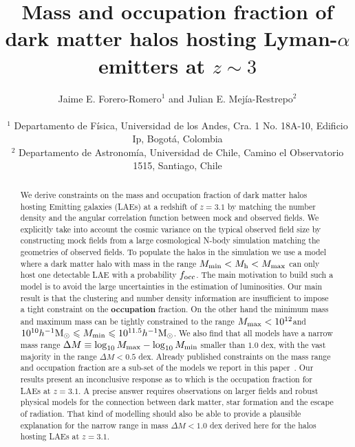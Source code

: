 \documentclass[usenatbib]{mn2e}
\newcommand{\documentname}{paper~}
\newcommand{\ly}{{\ifmmode{{\rm Ly}\alpha}\else{Ly$\alpha$~}\fi}}
\newcommand{\hMsun}{{\ifmmode{h^{-1}{\rm
        {M_{\odot}}}}\else{$h^{-1}{\rm{M_{\odot}}}$}\fi}}
\begin{document}
\title[Halo mass and occupation fraction of LAEs at$z=3.1$]{Mass and
  occupation fraction of dark matter halos hosting Lyman-$\alpha$
  emitters at $z\sim 3$}      
\author[~J.~E. Forero-Romero and ~J.~E. Mejia-Restreo]{
\parbox[t]{\textwidth}{\raggedright 
  Jaime E. Forero-Romero$^{1}$ and
  Julian E. Mej\'ia-Restrepo$^{2}$ 
}
\vspace*{6pt}\\
$^{1}$ Departamento de F\'{i}sica, Universidad de los Andes, Cra. 1
No. 18A-10, Edificio Ip, Bogot\'a, Colombia \\
$^{2}$ Departamento de Astronom\'{i}a, Universidad de Chile, Camino el
Observatorio 1515, Santiago, Chile} 

\maketitle

\begin{abstract}
%
We derive constraints on the mass and occupation fraction of dark
matter halos hosting \ly Emitting galaxies (LAEs) at a redshift of
$z=3.1$ by matching the number density and the angular
correlation function between mock and observed fields. We explicitly
take into account the cosmic variance on the typical observed field
size by constructing mock fields from a large cosmological N-body
simulation matching the geometries of observed fields. To populate the
halos in the simulation we use a model where a dark matter halo with
mass in the range $M_{\rm min}<M_{\rm h}<M_{\rm max}$ can only host
one detectable LAE with a probability $f_{\rm occ}$. The main motivation to
build such a model is to avoid the large uncertainties in the
estimation of \ly luminosities. Our main result is that the clustering
and number density information are insufficient to impose a tight
constraint on the {\bf occupation} fraction. On the other hand the
minimum mass and maximum mass can be tightly constrained to the range
$M_{\rm max}<10^{12}$\hMsun and $10^{10}\hMsun\leq M_{\rm min}\leq
10^{11.5}\hMsun$.  We also find that all models have a narrow mass
range $\Delta M \equiv \log_{10}M_{\rm max} - \log_{10} M_{\rm min}$
smaller than $1.0$ dex, with the vast majority in the range $\Delta
M<0.5$ dex. Already published constraints on the mass range and
occupation fraction are a sub-set of the models we report in this
\documentname. Our results present an inconclusive response as to
which is the occupation fraction for LAEs at $z=3.1$. A precise answer
requires observations on larger fields and robust physical models for
the connection between dark matter, star formation and the escape of
\ly radiation. That kind of modelling should also be able to provide a
plausible explanation for the narrow range in mass $\Delta M<1.0$ dex
derived here for the halos hosting LAEs at $z=3.1$.     

\end{abstract}
\end{document}
